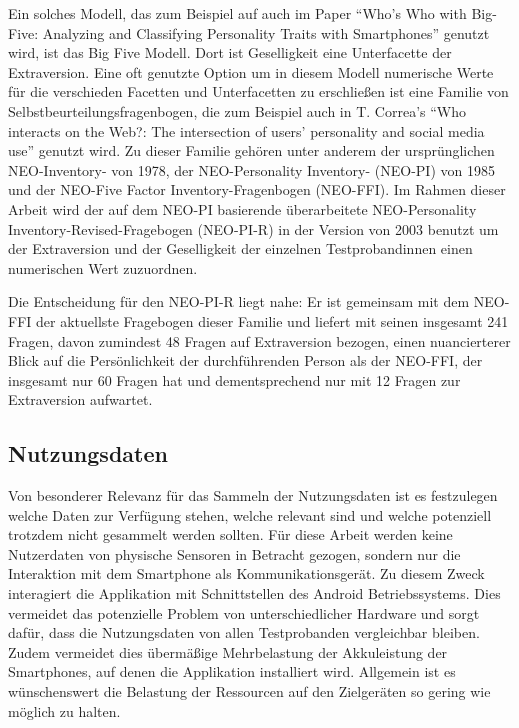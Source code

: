 Ein solches Modell, das zum Beispiel auf auch im Paper "`Who’s Who with Big-Five: Analyzing and Classifying Personality Traits with Smartphones"'\cite{chittaranjan2011s} genutzt wird, ist das Big Five Modell.
Dort ist Geselligkeit eine Unterfacette der Extraversion.
Eine oft genutzte Option um in diesem Modell numerische Werte für die verschieden Facetten und Unterfacetten zu erschließen ist eine Familie von Selbstbeurteilungsfragenbogen,
die zum Beispiel auch in T. Correa's "`Who interacts on the Web?: The intersection of users’ personality and social media use"' \cite{butt2008personality} genutzt wird.
Zu dieser Familie gehören unter anderem der ursprünglichen NEO-Inventory-  von 1978, der NEO-Personality Inventory- (NEO-PI) von 1985 und der NEO-Five Factor Inventory-Fragenbogen (NEO-FFI).
Im Rahmen dieser Arbeit wird der auf dem NEO-PI basierende überarbeitete NEO-Personality Inventory-Revised-Fragebogen (NEO-PI-R) in der Version von 2003 benutzt\cite{neopir2003}
um der Extraversion und der Geselligkeit der einzelnen Testprobandinnen einen numerischen Wert zuzuordnen.

Die Entscheidung für den NEO-PI-R liegt nahe: 
Er ist gemeinsam mit dem NEO-FFI der aktuellste Fragebogen dieser Familie und liefert mit seinen insgesamt 241 Fragen, davon zumindest 48 Fragen auf Extraversion bezogen,
einen nuancierterer Blick auf die Persönlichkeit der durchführenden Person als der NEO-FFI, der insgesamt nur 60 Fragen hat und dementsprechend nur mit 12 Fragen zur Extraversion aufwartet.



\subsection{Nutzungsdaten}

Von besonderer Relevanz für das Sammeln der Nutzungsdaten ist es festzulegen welche Daten zur Verfügung stehen, welche relevant sind und welche potenziell trotzdem nicht gesammelt werden sollten.
Für diese Arbeit werden keine Nutzerdaten von physische Sensoren in Betracht gezogen, sondern nur die Interaktion mit dem Smartphone als Kommunikationsgerät.
Zu diesem Zweck interagiert die Applikation mit Schnittstellen des Android Betriebssystems.
Dies vermeidet das potenzielle Problem von unterschiedlicher Hardware und sorgt dafür, dass die Nutzungsdaten von allen Testprobanden vergleichbar bleiben.
Zudem vermeidet dies übermäßige Mehrbelastung der Akkuleistung der Smartphones, auf denen die Applikation installiert wird.
Allgemein ist es wünschenswert die Belastung der Ressourcen auf den Zielgeräten so gering wie möglich zu halten.
\par

